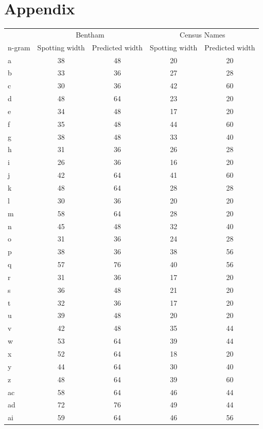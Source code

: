 \documentclass[ms,electronic,twosidetoc,letterpaper,chaptercenter,parttop,lof,lot]{byumsphd}
\begin{document}
\chapter{Appendix}

\begin{table}
\centering
\begin{tabular}{| l | c c | c c |}
  \hline
  & \multicolumn{2}{c|}{Bentham} & \multicolumn{2}{c|}{Census Names}\\
  n-gram & Spotting width & Predicted width & Spotting width & Predicted width \\
  \hline
  a & 38 & 48 & 20 & 20 \\
  b & 33 & 36 & 27 & 28 \\
  c & 30 & 36 & 42 & 60 \\
  d & 48 & 64 & 23 & 20 \\
  e & 34 & 48 & 17 & 20 \\
  f & 35 & 48 & 44 & 60 \\
  g & 38 & 48 & 33 & 40 \\
  h & 31 & 36 & 26 & 28 \\
  i & 26 & 36 & 16 & 20 \\
  j & 42 & 64 & 41 & 60 \\
  k & 48 & 64 & 28 & 28 \\
  l & 30 & 36 & 20 & 20 \\
  m & 58 & 64 & 28 & 20 \\
  n & 45 & 48 & 32 & 40 \\
  o & 31 & 36 & 24 & 28 \\
  p & 38 & 36 & 38 & 56 \\
  q & 57 & 76 & 40 & 56 \\
  r & 31 & 36 & 17 & 20 \\
  s & 36 & 48 & 21 & 20 \\
  t & 32 & 36 & 17 & 20 \\
  u & 39 & 48 & 20 & 20 \\
  v & 42 & 48 & 35 & 44 \\
  w & 53 & 64 & 39 & 44 \\
  x & 52 & 64 & 18 & 20 \\
  y & 44 & 64 & 30 & 40 \\
  z & 48 & 64 & 39 & 60 \\
  ac & 58 & 64 & 46 & 44 \\
  ad & 72 & 76 & 49 & 44 \\
  ai & 59 & 64 & 46 & 56 \\

\end{tabular}
\end{table}
\end{document}
